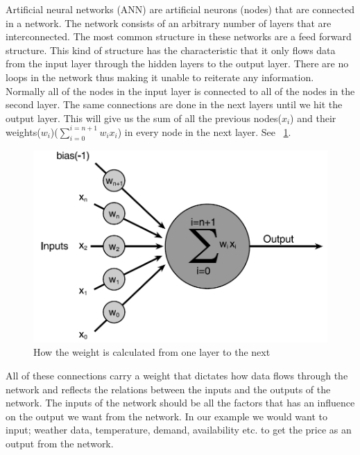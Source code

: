 Artificial neural networks (ANN) are artificial neurons (nodes) that are connected in a network. The network consists of an arbitrary number of layers that are interconnected. The most common structure in these networks are a feed forward structure. This kind of structure has the characteristic that it only flows data from the input layer through the hidden layers to the output layer. There are no loops in the network thus making it unable to reiterate any information. Normally all of the nodes in the input layer is connected to all of the nodes in the second layer. The same connections are done in the next layers until we hit the output layer. This will give us the sum of all the previous nodes($x_i$) and their weights($w_i$)($\sum_{i=0}^{i=n+1} w_i x_i$) in every node in the next layer. See ~\ref{fig:weight_of_layers}.
\begin{figure}[!ht]
\centering
\includegraphics[width=0.8\linewidth]{billeder/weight_of_layers.png}
\caption{How the weight is calculated from one layer to the next}
\label{fig:weight_of_layers}
\end{figure}
All of these connections carry a weight that dictates how data flows through the network and reflects the relations between the inputs and the outputs of the network. The inputs of the network should be all the factors that has an influence on the output we want from the network. In our example we would want to input; weather data, temperature, demand, availability etc. \cite{21} to get the price as an output from the network.

